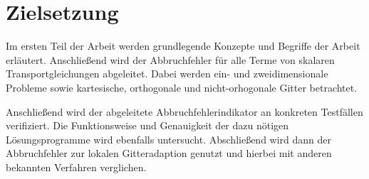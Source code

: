 \section{Zielsetzung}

Im ersten Teil der Arbeit werden grundlegende Konzepte und Begriffe der Arbeit erläutert.
Anschließend wird der Abbruchfehler für alle Terme von skalaren Transportgleichungen
abgeleitet. Dabei werden ein- und zweidimensionale Probleme sowie kartesische, orthogonale
und nicht-orhogonale Gitter betrachtet.

Anschließend wird der abgeleitete Abbruchfehlerindikator an konkreten Testfällen verifiziert.
Die Funktionsweise und Genauigkeit der dazu nötigen Lösungsprogramme wird ebenfalls
untersucht. Abschließend wird dann der Abbruchfehler zur lokalen Gitteradaption genutzt
und hierbei mit anderen bekannten Verfahren verglichen.



\cleardoublepage
